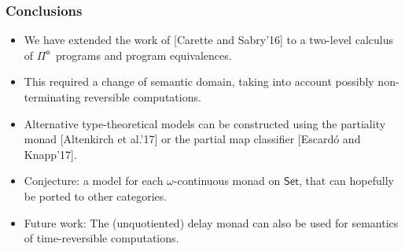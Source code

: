 \documentclass[12pt,t]{beamer}
\newcommand{\Pio}{\ensuremath{\mathsf{\Pi}^{\mathsf{o}}}}
\newcommand{\Set}{\mathsf{Set}}
\begin{document}
\begin{frame}
  \frametitle{Conclusions}
  \begin{itemize}
  \item We have extended the work of [Carette and Sabry'16] to a
    two-level calculus of \Pio\ programs and program equivalences.
    \item This required a change of semantic domain, taking into
      account possibly non-terminating reversible computations.
    \item Alternative type-theoretical models can be constructed using
      the partiality monad [Altenkirch et al.'17] or the partial map
      classifier [Escardó and Knapp'17].
    \item Conjecture: a model for each $\omega$-continuous
      monad on $\Set$, that can hopefully be ported to other categories. 
    \item Future work: The (unquotiented) delay monad can also be used for
      semantics of time-reversible computations.
      
      
  \end{itemize}
\end{frame}

\end{document}

